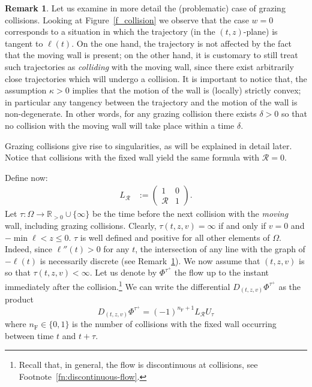 \documentclass[10pt]{amsart}
\theoremstyle{definition}\newtheorem{defi}[theo]{Definition}\newtheorem{rema}[theo]{Remark}\newtheorem{exam}[theo]{Example}\newtheorem{exem}[theo]{Example}\newtheorem{nota}[theo]{Notation}
\newcommand{\fft}{\tau}
\newcommand{\curv}{\kappa}
\newcommand{\fixw}{\mathrm{F}}
\newcommand{\bR}{\mathbb{R}}
\newcommand{\cpar}{\mathcal{R}}
\newcommand{\matrixtt}[4]{\left(
\begin{array}{cc}#1&#2\\#3&#4
\end{array}\right)}
\newcommand{\exph}{\Omega}
\newcommand{\flow}[1]{\Phi^{#1}}
\begin{document}
\begin{rema}\label{rem:grazing_collisions}
Let us examine in more detail the (problematic) case of grazing collisions. Looking at Figure~\ref{f_collision} we observe that the case $w = 0$ corresponds to a situation in which the trajectory (in the $(t,z)$-plane) is tangent to $\ell(t)$. On the one hand, the trajectory is not affected by the fact that the moving wall is present; on the other hand, it is customary to still treat such trajectories as \emph{colliding} with the moving wall, since there exist arbitrarily close trajectories which will undergo a collision. It is important to notice that, the assumption $\curv > 0$ implies that the motion of the wall is (locally) strictly convex; in particular any tangency between the trajectory and the motion of the wall is non-degenerate. In other words, for any grazing collision there exists $\delta > 0$ so that no collision with the moving wall will take place within a time $\delta$.
\end{rema}

Grazing collisions give rise to singularities, as will be explained in detail later. Notice that collisions with the fixed wall yield the same formula with $\cpar=0$.

Define now:
\begin{align*}
L_\cpar&:=\matrixtt{1}{0}{\cpar}{1}.
\end{align*}
Let $\fft:\exph\to\bR_{ > 0}\cup\{\infty\}$ be the time before the next collision with the \emph{moving} wall, including grazing collisions. Clearly, $\fft(t,z,v) = \infty$ if and only if $v = 0$ and $-\min \ell< z \le 0$. $\fft$ is well defined and positive for all other elements of $\exph$. Indeed, since $\ell''(t) > 0$ for any $t$, the intersection of any line with the graph of $-\ell(t)$ is necessarily discrete (see Remark~\ref{rem:grazing_collisions}). We now assume that $(t,z,v)$ is so that $\fft(t,z,v) < \infty$. Let us denote by $\flow{\fft^{+}}$ the flow up to the instant immediately after the collision.\footnote{Recall that, in general, the flow is discontinuous at collisions, see Footnote~\ref{fn:discontinuous-flow}.}
We can write the differential $D_{(t,z,v)}\flow{\fft^{+}}$ as the product
\begin{equation}\label{e_Differential}
{D_{(t,z,v)}\flow{\fft^{+}}}= {(-1)}^{n_\fixw+1} L_{\cpar}U_{\fft}
\end{equation}
where $n_{\fixw}\in\{0,1\}$ is the number of collisions with the fixed wall occurring between time $t$ and $t+\fft$.
\end{document}

